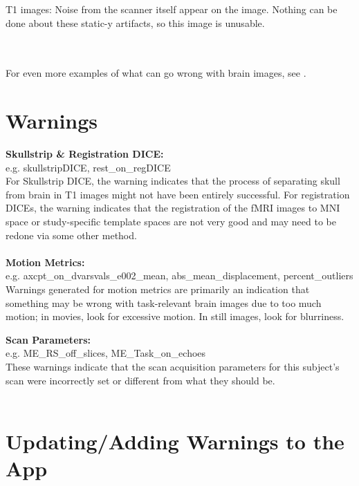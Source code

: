 \documentclass[12pt]{article}
\begin{document}
\hfill%
\begin{minipage}{0.6\textwidth}
	T1 images: Noise from the scanner itself appear on the image. Nothing can be done about these static-y artifacts, so this image is unusable. 
\end{minipage}
\\\\
\newline
For even more examples of what can go wrong with brain images, see \href{http://cbs.fas.harvard.edu/usr/mcmains/CBS_MRI_Quality_Control_Workshop.pdf}{\color{cyan}{this}}.

\section{Warnings}
\noindent\textbf{Skullstrip \& Registration DICE:} \\
e.g. skullstripDICE, rest\_on\_regDICE\\
For Skullstrip DICE, the warning indicates that the process of separating skull from brain in T1 images might not have been entirely successful. For registration DICEs, the warning indicates that the registration of the fMRI images to MNI space or study-specific template spaces are not very good and may need to be redone via some other method.\\\\

\textbf{Motion Metrics:} \\
e.g. axcpt\_on\_dvarsvals\_e002\_mean, abs\_mean\_displacement, percent\_outliers\\
 Warnings generated for motion metrics are primarily an indication that something may be wrong with task-relevant brain images due to too much motion; in movies, look for excessive motion. In still images, look for blurriness. 
 
\textbf{Scan Parameters:} \\
e.g. ME\_RS\_off\_slices, ME\_Task\_on\_echoes\\
These warnings indicate that the scan acquisition parameters for this subject's scan were incorrectly set or different from what they should be.\\\\

\section{Updating/Adding Warnings to the App}
\end{document}
